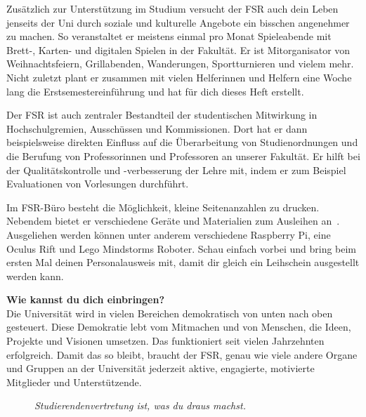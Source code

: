 Zusätzlich zur Unterstützung im Studium versucht der FSR auch dein Leben jenseits der Uni durch soziale und kulturelle Angebote ein bisschen angenehmer zu machen.
So veranstaltet er meistens einmal pro Monat Spieleabende mit Brett-, Karten- und digitalen Spielen in der Fakultät.
Er ist Mitorganisator von Weihnachtsfeiern, Grillabenden, Wanderungen, Sportturnieren und vielem mehr.
Nicht zuletzt plant er zusammen mit vielen Helferinnen und Helfern eine Woche lang die Erstsemestereinführung und hat für dich dieses Heft erstellt.

Der FSR ist auch zentraler Bestandteil der studentischen Mitwirkung in Hochschulgremien, Ausschüssen und Kommissionen.
Dort hat er dann beispielsweise direkten Einfluss auf die Überarbeitung von Studienordnungen und die Berufung von Professorinnen und Professoren an unserer Fakultät.
Er hilft bei der Qualitätskontrolle und -verbesserung der Lehre mit, indem er zum Beispiel Evaluationen von Vorlesungen durchführt.

Im FSR-Büro besteht die Möglichkeit, kleine Seitenanzahlen zu drucken.
Nebendem bietet er verschiedene Geräte und Materialien zum Ausleihen an~.
Ausgeliehen werden können unter anderem verschiedene Raspberry Pi, eine Oculus Rift und Lego Mindstorms Roboter.
Schau einfach vorbei und bring beim ersten Mal deinen Personalausweis mit, damit dir gleich ein Leihschein ausgestellt werden kann.


\textbf{Wie kannst du dich einbringen?} \\
Die Universität wird in vielen Bereichen demokratisch von unten nach oben gesteuert. Diese Demokratie lebt vom Mitmachen und von Menschen, die Ideen, Projekte und Visionen umsetzen.
Das funktioniert seit vielen Jahrzehnten erfolgreich.
Damit das so bleibt, braucht der FSR, genau wie viele andere Organe und Gruppen an der Universität jederzeit aktive, engagierte, motivierte Mitglieder und Unterstützende.

\begin{figure}[h!]
\centering
\textit{Studierendenvertretung ist, was du draus machst.}
\end{figure}

